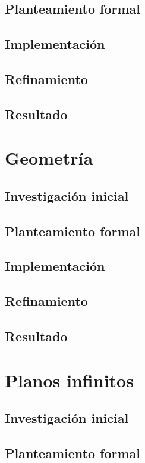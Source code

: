 \subsection{Planteamiento formal}
\subsection{Implementación}
\subsection{Refinamiento}
\subsection{Resultado}

\section{Geometría}

\subsection{Investigación inicial}
\subsection{Planteamiento formal}
\subsection{Implementación}
\subsection{Refinamiento}
\subsection{Resultado}

\section{Planos infinitos}

\subsection{Investigación inicial}
\subsection{Planteamiento formal}
